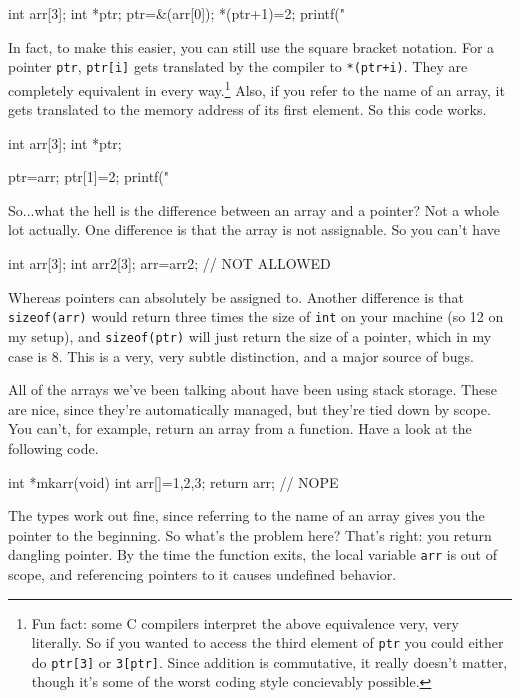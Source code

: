 \documentclass[ebook,11pt,oneside,openany]{memoir}
\newcommand{\cf}[1]{\texttt{#1}}
\begin{document}
\begin{code}[language=C]
int arr[3];
int *ptr;
ptr=&(arr[0]);
*(ptr+1)=2;
printf("%
\end{code}

In fact, to make this easier, you can still use the square bracket notation. For a pointer \cf{ptr}, \cf{ptr[i]} gets translated by the compiler to \cf{*(ptr+i)}. They are completely equivalent in every way.\footnote{Fun fact: some C compilers interpret the above equivalence very, very literally. So if you wanted to access the third element of \cf{ptr} you could either do \cf{ptr[3]} or \cf{3[ptr]}. Since addition is commutative, it really doesn't matter, though it's some of the worst coding style concievably possible.} Also, if you refer to the name of an array, it gets translated to the memory address of its first element. So this code works.

\begin{code}[language=C]
int arr[3];
int *ptr;

ptr=arr;
ptr[1]=2;
printf("%
\end{code}

So...what the hell is the difference between an array and a pointer? Not a whole lot actually. One difference is that the array is not assignable. So you can't have 

\begin{code}[language=C]
int arr[3];
int arr2[3];
arr=arr2; // NOT ALLOWED
\end{code}

\noindent
Whereas pointers can absolutely be assigned to. Another difference is that \cf{sizeof(arr)} would return three times the size of \cf{int} on your machine (so 12 on my setup), and \cf{sizeof(ptr)} will just return the size of a pointer, which in my case is 8. This is a very, very subtle distinction, and a major source of bugs.

All of the arrays we've been talking about have been using stack storage. These are nice, since they're automatically managed, but they're tied down by scope. You can't, for example, return an array from a function. Have a look at the following code.

\begin{code}[language=C]
int *mkarr(void)
{
  int arr[]={1,2,3};
  return arr; // NOPE
}
\end{code}

The types work out fine, since referring to the name of an array gives you the pointer to the beginning. So what's the problem here? That's right: you return dangling pointer. By the time the function exits, the local variable \cf{arr} is out of scope, and referencing pointers to it causes undefined behavior.
\end{document}
